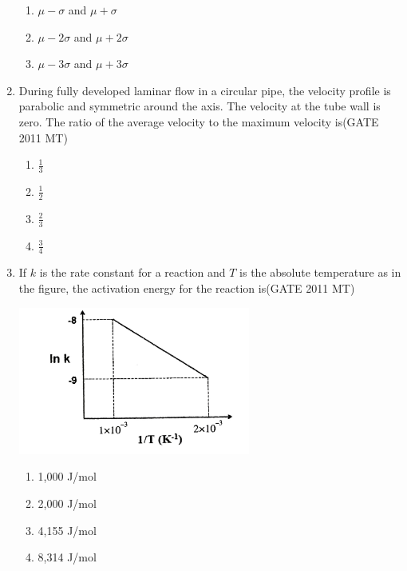 \documentclass[12pt]{article}
\begin{document}
\begin{enumerate}
\begin{enumerate}
        \item \(\mu - \sigma\) and \(\mu + \sigma\)
        \item \(\mu - 2\sigma\) and \(\mu + 2\sigma\)
        \item \(\mu - 3\sigma\) and \(\mu + 3\sigma\)
    \end{enumerate}
\item During fully developed laminar flow in a circular pipe, the velocity profile is parabolic and symmetric around the axis. The velocity at the tube wall is zero. The ratio of the average velocity to the maximum velocity is(GATE 2011 MT)
    \begin{enumerate}
        \item \(\frac{1}{3}\)
        \item \(\frac{1}{2}\)
        \item \(\frac{2}{3}\)
        \item \(\frac{3}{4}\)
    \end{enumerate}
\item If $k$ is the rate constant for a reaction and $T$ is the absolute temperature as in the figure, the activation energy for the reaction is(GATE 2011 MT)

\begin{center}
    \includegraphics[width=0.6\textwidth]{images/q31image.jpg}
\end{center}

\begin{enumerate}
    \item 1,000 J/mol
    \item 2,000 J/mol
    \item 4,155 J/mol
    \item 8,314 J/mol
\end{enumerate}


\end{enumerate}
\end{document}
